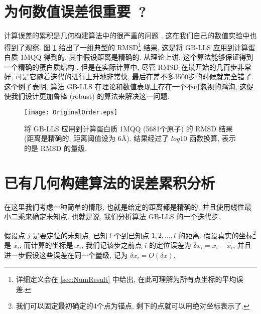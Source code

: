 \documentclass{CASthesis_zzk}
\begin{document}
\section{为何数值误差很重要~?}
\label{sec:ErrImportant}

计算误差的累积是几何构建算法中的很严重的问题 \cite{Wu2006,Wu2008}, 
这在我们自己的数值实验中也得到了观察.
图 \ref{fig:OriginalOrder} 给出了一组典型的 RMSD\footnote{详细定义会在 \ref{sec:NumResult} 中给出, 在此可理解为所有点坐标的平均误差.} 结果,
这是将 GB-LLS 应用到计算蛋白质 1MQQ 得到的, 其中假设距离是精确的.
从理论上讲, 这个算法能够保证得到一个精确的蛋白质结构 \cite{Sit2009}. 
但是在实际计算中, 尽管 RMSD 在最开始的几百步非常好, 
可是它随着迭代的进行上升地非常快,
最后在差不多3500步的时候就完全错了.
这个例子表明, 算法 GB-LLS 在理论和数值表现上存在一个不可忽视的鸿沟,
这促使我们设计更加鲁棒 (robust) 的算法来解决这一问题.

\begin{figure}[htbp!]
  \centering
  \texttt{[image: OriginalOrder.eps]}\\
  \caption{将 GB-LLS 应用到计算蛋白质 1MQQ (5681个原子) 的 RMSD 结果 (距离是精确的, 距离阈值设为 6\AA). 结果经过了 $log10$ 函数换算, 表示的是 RMSD 的量级.}
  \label{fig:OriginalOrder}
\end{figure}


\section{已有几何构建算法的误差累积分析}
\label{sec:ErrAnalysis}
在这里我们考虑一种简单的情形, 也就是给定的距离都是精确的,
并且使用线性最小二乘来确定未知点. 
也就是说, 我们分析算法 GB-LLS 的一个迭代步.

假设点 $j$ 是要定位的未知点, 已知 $l$ 个到已知点 $1,2,\ldots,l$ 的距离. 
假设真实的坐标\footnote{我们可以固定最初确定的4个点为锚点, 剩下的点就可以用绝对坐标表示了.}
是 $\widehat{x}_i$, 而计算的坐标是 $x_i$, 
我们记该步之前点 $i$ 的定位误差为 $\delta x_i=x_i-\widehat{x}_i$,
并且进一步假设这些误差在同一个量级, 记为 $\delta x_i=O(\delta x)$.
\end{document}
